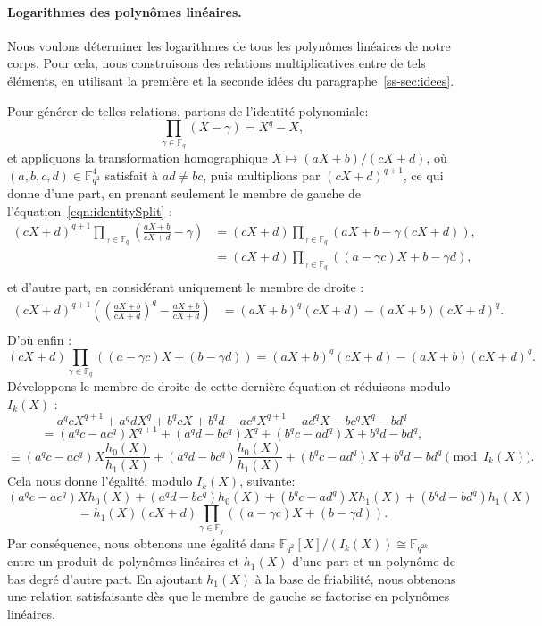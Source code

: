 \documentclass[a4paper, titlepage, 11pt]{article}
\theoremstyle{definition}
\theoremstyle{remark}
\def\gf #1{\mathbb{F}_{#1}}
\begin{document}
\paragraph{Logarithmes des polynômes linéaires.}Nous voulons déterminer les logarithmes de tous les polynômes linéaires de notre corps. Pour cela, nous construisons des relations multiplicatives entre de tels éléments, en utilisant la première et la seconde idées du paragraphe~\ref{ss-sec:idees}.

Pour générer de telles relations, partons de l'identité polynomiale:
\begin{equation}\label{eqn:identitySplit}
\prod_{\gamma\in\gf{q}} (X-\gamma) = X^q-X,
\end{equation}
et appliquons la transformation homographique $X \mapsto (aX+b)/(cX+d)$, où $(a,b,c,d)\in\gf{q^2}^4$ satisfait à $ad\neq bc$, puis multiplions par $(cX+d)^{q+1}$, ce qui donne d'une part, en prenant seulement le membre de gauche de l'équation~\ref{eqn:identitySplit} :
\begin{align*}
(cX+d)^{q+1} \prod_{\gamma\in\gf{q}} \left(\frac{aX+b}{cX+d}-\gamma\right) &= (cX+d) \prod_{\gamma\in\gf{q}} (aX+b-\gamma(cX+d)), \\
&= (cX+d) \prod_{\gamma\in\gf{q}} ((a-\gamma c)X+b-\gamma d),\\
\end{align*}
et d'autre part, en considérant uniquement le membre de droite :
\begin{align*}
(cX+d)^{q+1}\left({\left(\frac{aX+b}{cX+d}\right)}^q - \frac{aX+b}{cX+d}\right) &= (aX+b)^q(cX+d) - (aX+b)(cX+d)^q. \\
\end{align*}
D'où enfin :
$$(cX+d) \prod_{\gamma\in\gf{q}}((a-\gamma c)X + (b-\gamma d)) = (aX+b)^q(cX+d) - (aX+b)(cX+d)^q.$$
Développons le membre de droite de cette dernière équation et réduisons modulo $I_k(X)$ :
$$a^qcX^{q+1} + a^qdX^q + b^qcX + b^qd - ac^qX^{q+1} - ad^qX - bc^qX^q - bd^q$$
$$= (a^qc - ac^q)X^{q+1} + (a^qd - bc^q)X^q + (b^qc - ad^q)X + b^qd - bd^q,$$
$$\equiv (a^qc - ac^q)X\frac{h_0(X)}{h_1(X)} + (a^qd - bc^q)\frac{h_0(X)}{h_1(X)} + (b^qc - ad^q)X + b^qd - bd^q \pmod{I_k(X)}.$$
Cela nous donne l'égalité, modulo $I_k(X)$, suivante:
$$(a^qc - ac^q)Xh_0(X) + (a^qd - bc^q)h_0(X) + (b^qc - ad^q)Xh_1(X) + (b^qd - bd^q)h_1(X)$$
$$= h_1(X)(cX+d) \prod_{\gamma\in\gf{q}}((a-\gamma c)X + (b-\gamma d)).$$
Par conséquence, nous obtenons une égalité dans $\gf{q^2}[X]/(I_k(X)) \cong \gf{q^{2k}}$ entre un produit de polynômes linéaires et $h_1(X)$ d'une part et un polynôme de bas degré d'autre part. En ajoutant $h_1(X)$ à la base de friabilité, nous obtenons une relation satisfaisante dès que le membre de gauche se factorise en polynômes linéaires.
\end{document}
